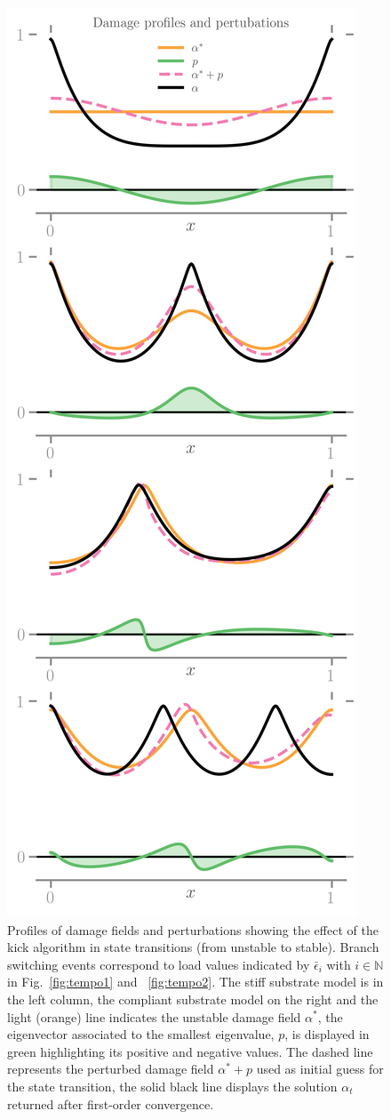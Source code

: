 \begin{figure}[htbp]
    \includegraphics*[align=c,width=.45\textwidth]{../images/model_compliant_kick_profiles.png}
    \caption{
        Profiles of damage fields and perturbations showing the effect of the kick algorithm in state transitions (from unstable to stable). Branch switching events correspond to load values indicated by $\bar \epsilon_i$ with $i\in \mathbb N$ in {Fig.~\ref{fig:tempo1} and ~\ref{fig:tempo2}}. The stiff substrate model is in the left column, the compliant substrate model on the right and  the light (orange) line indicates the unstable damage field $\alpha^*$, the eigenvector associated to the smallest eigenvalue, $p$, is displayed in green highlighting its positive and negative values. The dashed line represents the perturbed damage field  $\alpha^*+p$ used as initial guess for the state transition, the solid black line displays the solution $\alpha_t$ returned after first-order convergence.}
    \label{fig:kick}
\end{figure}



    

